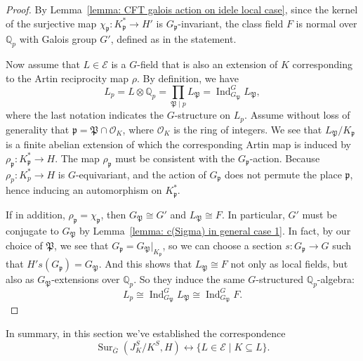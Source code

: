 \documentclass{amsart}
\numberwithin{equation}{section}
\theoremstyle{plain}
\theoremstyle{definition}
\theoremstyle{remark}
\begin{document}
\begin{proof}
	By Lemma~\ref{lemma: CFT galois action on idele local case}, since the kernel of the surjective map $\chi_{\mathfrak{p}}:K_{\mathfrak{p}}^*\to H'$ is $G_{\mathfrak{p}}$-invariant, the class field $F$ is normal over $\mathbb{Q}_p$ with Galois group $G'$, defined as in the statement.
	
	Now assume that $L\in\mathcal{E}$ is a $G$-field that is also an extension of $K$ corresponding to the Artin reciprocity map $\rho$.
	By definition, we have
	\begin{equation*}
		L_p=L\otimes\mathbb{Q}_p
		=\prod_{\mathfrak{P}\mid p}L_{\mathfrak{P}}
		=\operatorname{Ind}^G_{G_{\mathfrak{P}}}L_{\mathfrak{P}},
	\end{equation*}
	where the last notation indicates the $G$-structure on $L_p$.
	Assume without loss of generality that $\mathfrak{p}=\mathfrak{P}\cap\mathscr{O}_K$, where $\mathscr{O}_K$ is the ring of integers.
	We see that $L_{\mathfrak{P}}/K_{\mathfrak{p}}$ is a finite abelian extension of which the corresponding Artin map is induced by $\rho_{\mathfrak{p}}:K_{\mathfrak{p}}^*\to H$.
	The map $\rho_{\mathfrak{p}}$ must be consistent with the $G_{\mathfrak{p}}$-action.
	Because $\rho_p:K_p^*\to H$ is $G$-equivariant, and the action of $G_{\mathfrak{p}}$ does not permute the place $\mathfrak{p}$, hence inducing an automorphism on $K_{\mathfrak{p}}^*$.
	
	If in addition, $\rho_{\mathfrak{p}}=\chi_{\mathfrak{p}}$, then $G_{\mathfrak{P}}\cong G'$ and $L_{\mathfrak{P}}\cong F$.
	In particular, $G'$ must be conjugate to $G_{\mathfrak{P}}$ by Lemma~\ref{lemma: c(Sigma) in general case 1}.
	In fact, by our choice of $\mathfrak{P}$, we see that $G_{\mathfrak{p}}=G_{\mathfrak{P}}\vert_{K_{\mathfrak{p}}}$, so we can choose a section $s:G_{\mathfrak{p}}\to G$ such that $H's(G_{\mathfrak{p}})=G_{\mathfrak{P}}$.
	And this shows that $L_{\mathfrak{P}}\cong F$ not only as local fields, but also as $G_{\mathfrak{P}}$-extensions over $\mathbb{Q}_p$.
	So they induce the same $G$-structured $\mathbb{Q}_p$-algebra:
	\begin{equation*}
		L_p\cong\operatorname{Ind}^G_{G_{\mathfrak{P}}}L_{\mathfrak{P}}\cong\operatorname{Ind}^G_{G_{\mathfrak{P}}}F.
	\end{equation*}
\end{proof}
In summary, in this section we've established the correspondence
\begin{equation*}
	\operatorname{Sur}_{\bar{G}}(J_K^S/K^S,H)\leftrightarrow\{L\in\mathcal{E}\mid K\subseteq L\}.
\end{equation*}
\end{document}
